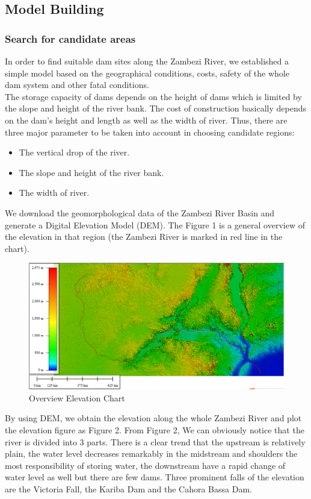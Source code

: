 \documentclass{mcmthesis}
\begin{document}
\subsection{Model Building}
\subsubsection{Search for candidate areas}
\indent \indent In order to find suitable dam sites along the Zambezi River, we established a simple model based on the geographical conditions, costs, safety of the whole dam system and other fatal conditions. \\
\indent The storage capacity of dams depends on the height of dams which is limited by the slope and height of the river bank. The cost of construction basically depends on the dam's height and length as well as the width of river. Thus, there are three major parameter to be taken into account in choosing candidate regions:
\begin{itemize}
\item The vertical drop of the river.
\item The slope and height of the river bank.
\item The width of river.
\end{itemize}

We download the geomorphological data of the Zambezi River Basin and generate a Digital Elevation Model (DEM). The Figure 1 is a general overview of the elevation in that region (the Zambezi River is marked in red line in the chart).

\begin{figure}[h]
\small
\centering
\includegraphics[width=14cm]{./figures/Sensing_Figure.png}
\caption{Overview Elevation Chart} \label{fig:Fig1}
\end{figure}

By using DEM, we obtain the elevation along the whole Zambezi River and plot the elevation figure as Figure 2. From Figure 2, We can obviously notice that the river is divided into 3 parts. There is a clear trend that the upstream is relatively plain, the water level decreases remarkably in the midstream and shoulders the most responsibility of storing water, the downstream have a rapid change of water level as well but there are few dams. Three prominent falls of the elevation are the Victoria Fall, the Kariba Dam and the Cahora Bassa Dam.
\end{document}
